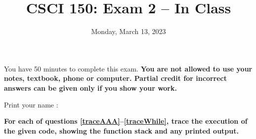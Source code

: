 \documentclass{article}
\begin{document}
\title{CSCI 150: Exam 2 -- In Class}
\author{}
\date{Monday, March 13, 2023}

\maketitle

\thispagestyle{empty}

 You  have 50
minutes to complete this exam. \textbf{You are not allowed to use your
  notes, textbook, phone or computer.  Partial credit for incorrect answers can be given only
  if you show your work.}  \bigskip

  \vspace{0.3in}

Print your name : \underline{\phantom{XXXXXXXXXXXXXXXXXXXXXXXXX}}
\vspace{1in}



\newpage

\textbf{For each of questions \ref{traceAAA}--\ref{traceWhile}, trace
  the execution of the given code, showing the function stack and any
  printed output.}
\end{document}
